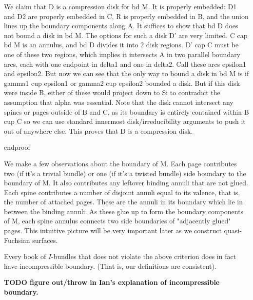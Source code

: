We claim that D is a compression disk for bd M. It is properly embedded: D1 and
D2 are properly embedded in C, R is properly embedded in B, and the union lines
up the boundary components along A. It suffices to show that bd D does not
bound a disk in bd M. The options for such a disk D' are very limited. C cap bd
M is an annulus, and bd D divides it into 2 disk regions. D' cap C must be one
of these two regions, which implies it intersects A in two parallel boundary
arcs, each with one endpoint in delta1 and one in delta2. Call these arcs
epsilon1 and epsilon2. But now we can see that the only way to bound a disk in
bd M is if gamma1 cup epsilon1 or gamma2 cup epsilon2 bounded a disk. But if
this disk were inside B, either of these would project down to Si to contradict
the assumption that alpha was essential. Note that the disk cannot intersect
any spines or pages outside of B and C, as its boundary is entirely contained
within B cup C so we can use standard innermost disk/irreducibility arguments
to push it out of anywhere else. This proves that D is a compression disk.

endproof

We make a few observations about the boundary of M. Each page contributes two
(if it's a trivial bundle) or one (if it's a twisted bundle) side boundary to
the boundary of M. It also contributes any leftover binding annuli that are not
glued. Each spine contributes a number of disjoint annuli equal to its valence,
that is, the number of attached pages. These are the annuli in its boundary
which lie in between the binding annuli. As these glue up to form the boundary
components of M, each spine annulus connects two side boundaries of "adjacently
glued" pages. This intuitive picture will be very important later as we
construct quasi-Fuchsian surfaces.


\begin{prop}

Every book of $I$-bundles that does not violate the above criterion does in
fact have incompressible boundary. (That is, our definitions are consistent).


\end{prop}

\textbf{TODO figure out/throw in Ian's explanation of incompressible boundary.}

